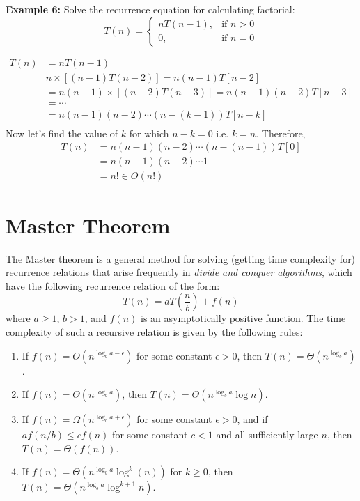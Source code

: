 \documentclass[a4paper,11pt]{book}
\begin{document}
\noindent \textbf{Example 6:} Solve the recurrence equation for calculating factorial:
\[
   T(n) = 
\begin{cases}
    nT(n-1) , & \text{if } n > 0\\
    0,                   & \text{if } n = 0
\end{cases}
\]

\begin{align*}
	T(n) &= nT(n-1) \\
	     & n \times \left[(n-1)T(n-2)\right] = n(n-1) T[n-2] \\
	     &= n(n-1) \times \left[(n-2)T(n-3)\right] = n(n-1)(n-2) T[n-3]\\
	     &= \cdots\\
	     &= n(n-1)(n-2) \cdots (n-(k-1))T[n-k]\\
\end{align*}
\noindent Now let's find the value of $k$ for which $n-k = 0$ i.e. $k=n$. Therefore,
\begin{align*}
	T(n) &= n(n-1)(n-2) \cdots (n-(n-1))T[0]\\
	     &= n(n-1)(n-2) \cdots 1\\
	     &= n! \in O(n!)
\end{align*}
\section{Master Theorem}

\noindent The Master theorem is a general method for solving (getting time complexity for) recurrence relations that arise frequently in \textit{divide and conquer algorithms}, which have the following recurrence relation of the form: 
$$T(n) = a T\left(\dfrac{n}{b}\right)+f(n)$$
\noindent where $a \ge 1$, $b > 1$, and $f(n)$ is an asymptotically positive function. The time complexity of such a recursive relation is given by the following rules:

\begin{enumerate}
\item If $f(n) = O(n^{\log_ba-\epsilon})$ for some constant
$\epsilon>0$, then $T(n) = \Theta(n^{\log_ba})$.
\item If $f(n) = \Theta(n^{\log_ba})$, then $T(n) =
\Theta(n^{\log_ba} \log n)$.
\item If $f(n) = \Omega(n^{\log_ba+\epsilon})$ for some constant $\epsilon>0$, and if $a f(n/b) \le c f(n)$ for some constant $c<1$ and all sufficiently large $n$, then $T(n) = \Theta(f(n))$.
\item If $f(n) = \Theta(n^{\log_ba} \log^k(n))$ for $k\ge 0$, then
$T(n) = \Theta(n^{\log_ba} \log^{k+1} n)$.
\end{enumerate}
\end{document}
